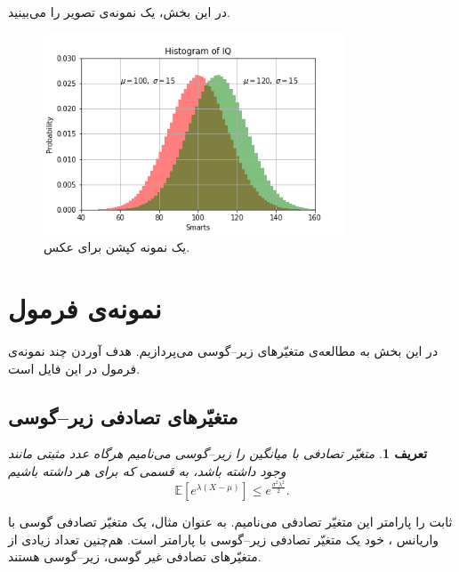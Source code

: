 \documentclass[BScThesis, onesided]{thesis}
\newtheorem{definition}[theorem]{تعریف}
\newcommand{\E}{\mathbb{E}}
\begin{document}
در این بخش، یک نمونه‌ی تصویر را می‌بینید.

\begin{figure}[h!]
    \centering
    \includegraphics[width=0.8\textwidth]{save.png}
    \caption{یک نمونه کپشن برای عکس.}
    \label{fig:my_label}
\end{figure}


\section{نمونه‌ی فرمول}

در این بخش به مطالعه‌ی متغیّرهای زیر--گوسی می‌پردازیم. هدف آوردن چند نمونه‌ی فرمول در این فایل است.

	\subsection{متغیّرهای تصادفی زیر--گوسی}
	\begin{definition}
		متغیّر تصادفی
		با میانگین
		را زیر--گوسی می‌نامیم هرگاه عدد مثبتی مانند
		\lr{$\sigma$}
		وجود داشته باشد، به قسمی که برای هر
		داشته باشیم
		\[\E\left[e^{\lambda(X-\mu)}\right]\leq e^{\frac{\sigma^2\lambda^2}{2}}.\]
	\end{definition}
	ثابت
	\lr{$\sigma$}
	را پارامتر این متغیّر تصادفی می‌نامیم. به عنوان مثال، یک متغیّر تصادفی گوسی با واریانس
	،
	خود یک متغیّر تصادفی زیر--گوسی با پارامتر
	\lr{$\sigma$}
	است. هم‌چنین تعداد زیادی از متغیّرهای تصادفی غیر گوسی، زیر--گوسی هستند.
	
\end{document}

